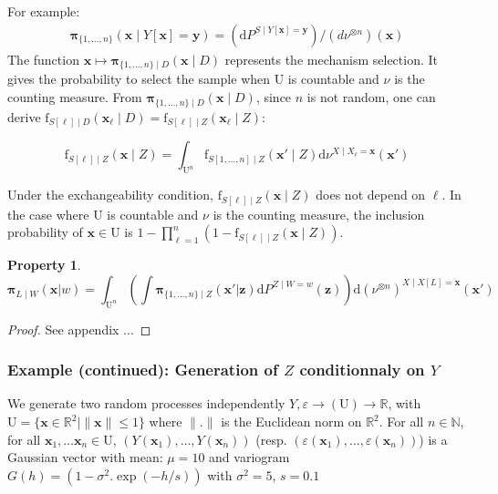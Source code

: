 \documentclass[12pt]{article}
\newtheorem{property}{Property}[section]
\theoremstyle{definition}
\theoremstyle{remark}
\newcommand{\dominantU}{\nu}
\newcommand{\sampledensity}{\mathbf{\pi}}
\newcommand{\derive}{\mathrm{d}}
\newcommand{\Design}{D}
\newcommand{\density}{\mathrm{f}}
\newcommand{\Semivariogram}{G}
\newcommand{\Sample}{S}
\newcommand{\Pop}{\mathrm{U}}
\newcommand{\position}{\mathbf{x}}
\newcommand{\Sampleindex}{L}
\newcommand{\Signal}{Y}
\newcommand{\signal}{\mathbf{y}}
\newcommand{\Desvar}{Z}
\newcommand{\desvar}{\mathbf{z}}
\begin{document}
For example:
\begin{eqnarray}\label{eq:iurheiuhgiuh}
\sampledensity_{\{1,\ldots,n\}}\left(\position \mid \Signal[\position]=
    \signal\right)=
(\mathrm{d}P^{\Sample\mid \Signal[\position]= \signal})/(d\dominantU^{\otimes n})(\position)
\end{eqnarray}
The function $\position\mapsto\sampledensity_{\{1,\ldots,n\}\mid\Design}\left(\position \mid \Design\right)$ represents the mechanism selection. It gives the probability to select the sample when $\Pop$ is countable and $\dominantU$ is the counting measure.
From $\sampledensity_{\{1,\ldots,n\}\mid\Design}\left(\position \mid \Design\right)$, since $n$ is not random, one can derive  $\density_{\Sample[\ell]\mid \Design}(\position_\ell\mid \Design)=
\density_{\Sample[\ell]\mid \Desvar}(\position_\ell\mid \Desvar)$:

$$\density_{\Sample[\ell]\mid \Desvar}(\position\mid \Desvar)=
\int_{\Pop^n}
{\density_{\Sample[1,\ldots,n]\mid \Desvar}(\position'\mid \Desvar)}
\derive \dominantU^{X\mid X_\ell=\position}(\position')$$

Under the exchangeability condition, 
$\density_{\Sample[\ell]\mid \Desvar}(\position\mid \Desvar)$ does not depend on $\ell$. In the case where $\Pop$ is countable and $\dominantU$ is the counting measure, the inclusion probability of $\position\in\Pop$ is $1-\prod_{\ell=1}^n(1-\density_{\Sample[\ell]\mid \Desvar}(\position\mid \Desvar))$.


\begin{property}\label{prop:oijsoidfj}
\begin{equation}
    \sampledensity_{\Sampleindex\mid W}\left(\position|w\right)=
    \int_{\Pop^n}\left(
    \int \sampledensity_{\{1,\ldots,n\}\mid \Desvar}\left(\position'|\desvar\right) \derive P^{\Desvar\mid W=w}(\desvar)\right)
    \derive\left(\nu^{\otimes n}\right)^{X\mid X[\Sampleindex]=\position}(\position')
\end{equation}
\end{property}
\begin{proof}
See appendix ...
\end{proof}



\subsubsection*{Example (continued): Generation of $\Desvar$ conditionnaly on $\Signal$}
We generate two random processes independently 
$\Signal,\varepsilon\to\left(\Pop\right)\to\mathbb{R}$, with $\Pop=\{\position\in\mathbb{R}^2\mid \|\position\|\leq 1\}$ where $\|.\|$ is the Euclidean norm on $\mathbb{R}^2$.
For all $n\in\mathbb{N}$, for all $\position_1,\ldots\position_n\in\Pop$, 
$\left(\Signal(\position_1),\ldots,\Signal(\position_n)\right)$ (resp. $\left(\varepsilon(\position_1),\ldots,\varepsilon(\position_n)\right)$)  is a Gaussian vector with mean:
$\mu=10$ and variogram $\Semivariogram\left(h\right)=(1-\sigma^2.\exp(-h/s))$
with $\sigma^2=5$, $s=0.1$
\end{document}
